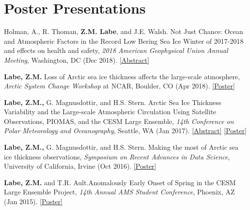 \documentclass[margin,line,palatino,courier,10pt]{res}
\begin{document}
\begin{resume}
\begin{etaremune}[leftmargin=0in,topsep=0in,parsep=0in]
\end{etaremune}

\section{\sc \textcolor{Cerulean}{\large{\textbf{Poster Presentations}}}}
\begin{etaremune}[leftmargin=0in,topsep=0in,parsep=0in]
\item Holman, A., R. Thoman, \textbf{Z.M. Labe}, and J.E. Walsh. Not Just Chance: Ocean and Atmospheric Factors in the Record Low Bering Sea Ice Winter of 2017-2018 and effects on health and safety, \textit{2018 American Geophysical Union Annual Meeting}, Washington, DC (Dec 2018). \href{https://agu.confex.com/agu/fm18/meetingapp.cgi/Paper/451295}{[Abstract]}
\item \textbf{Labe, Z.M.} Loss of Arctic sea ice thickness affects the large-scale atmosphere, \textit{Arctic System Change Workshop} at NCAR, Boulder, CO (Apr 2018). \href{https://sites.uci.edu/zlabe/files/2019/09/ZLabe_042018_BigIdeaPoster.pdf}{[Poster]}
\item \textbf{Labe, Z.M.,} G. Magnusdottir, and H.S. Stern. Arctic Sea Ice Thickness Variability and the Large-scale Atmospheric Circulation Using Satellite Observations, PIOMAS, and the CESM Large Ensemble, \textit{14th Conference on Polar Meteorology and Oceanography}, Seattle, WA (Jan 2017). \href{https://ams.confex.com/ams/97Annual/webprogram/Paper313445.html}{[Abstract]} \href{http://sites.uci.edu/zlabe/files/2017/01/ZLabeMagnusdottirStern_AMSposter_2017.pdf}{[Poster]}
\item \textbf{Labe, Z.M.,} G. Magnusdottir, and H.S. Stern. Making the most of Arctic sea ice thickness observations, \textit{Symposium on Recent Advances in Data Science}, University of California, Irvine (Oct 2016). \href{http://sites.uci.edu/zlabe/files/2016/10/ZLabeMagnusdottirStern_DSIposter_Oct16.pdf}{[Poster]}
\item \textbf{Labe, Z.M.} and T.R. Ault.\@ Anomalously Early Onset of Spring in the CESM Large Ensemble Project, \textit{14th Annual AMS Student Conference}, Phoenix, AZ (Jan 2015). \href{https://ams.confex.com/ams/95Annual/webprogram/Paper271063.html}{[Poster]} 

\end{etaremune}

\vspace{-0.1in}
\noindent\textcolor{Cerulean}{\makebox[\linewidth][r]{\rule{\textwidth}{5pt}}}
\vspace{-0.3in}


\end{resume}
\end{document}
